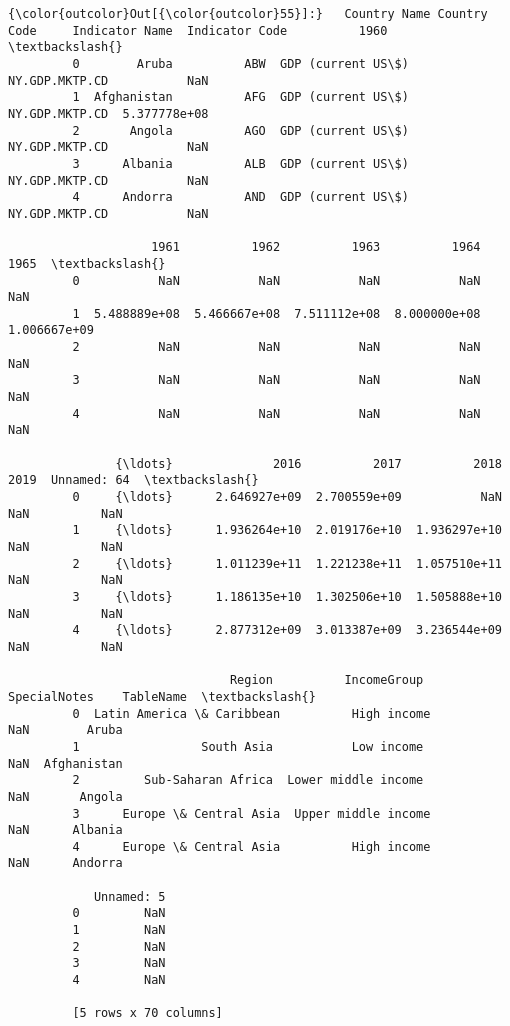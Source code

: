 \documentclass[11pt]{article}
\begin{document}
\begin{Verbatim}[commandchars=\\\{\}]
{\color{outcolor}Out[{\color{outcolor}55}]:}   Country Name Country Code     Indicator Name  Indicator Code          1960  \textbackslash{}
         0        Aruba          ABW  GDP (current US\$)  NY.GDP.MKTP.CD           NaN   
         1  Afghanistan          AFG  GDP (current US\$)  NY.GDP.MKTP.CD  5.377778e+08   
         2       Angola          AGO  GDP (current US\$)  NY.GDP.MKTP.CD           NaN   
         3      Albania          ALB  GDP (current US\$)  NY.GDP.MKTP.CD           NaN   
         4      Andorra          AND  GDP (current US\$)  NY.GDP.MKTP.CD           NaN   
         
                    1961          1962          1963          1964          1965  \textbackslash{}
         0           NaN           NaN           NaN           NaN           NaN   
         1  5.488889e+08  5.466667e+08  7.511112e+08  8.000000e+08  1.006667e+09   
         2           NaN           NaN           NaN           NaN           NaN   
         3           NaN           NaN           NaN           NaN           NaN   
         4           NaN           NaN           NaN           NaN           NaN   
         
               {\ldots}              2016          2017          2018  2019  Unnamed: 64  \textbackslash{}
         0     {\ldots}      2.646927e+09  2.700559e+09           NaN   NaN          NaN   
         1     {\ldots}      1.936264e+10  2.019176e+10  1.936297e+10   NaN          NaN   
         2     {\ldots}      1.011239e+11  1.221238e+11  1.057510e+11   NaN          NaN   
         3     {\ldots}      1.186135e+10  1.302506e+10  1.505888e+10   NaN          NaN   
         4     {\ldots}      2.877312e+09  3.013387e+09  3.236544e+09   NaN          NaN   
         
                               Region          IncomeGroup  SpecialNotes    TableName  \textbackslash{}
         0  Latin America \& Caribbean          High income           NaN        Aruba   
         1                 South Asia           Low income           NaN  Afghanistan   
         2         Sub-Saharan Africa  Lower middle income           NaN       Angola   
         3      Europe \& Central Asia  Upper middle income           NaN      Albania   
         4      Europe \& Central Asia          High income           NaN      Andorra   
         
            Unnamed: 5  
         0         NaN  
         1         NaN  
         2         NaN  
         3         NaN  
         4         NaN  
         
         [5 rows x 70 columns]
\end{Verbatim}
            
\end{document}
